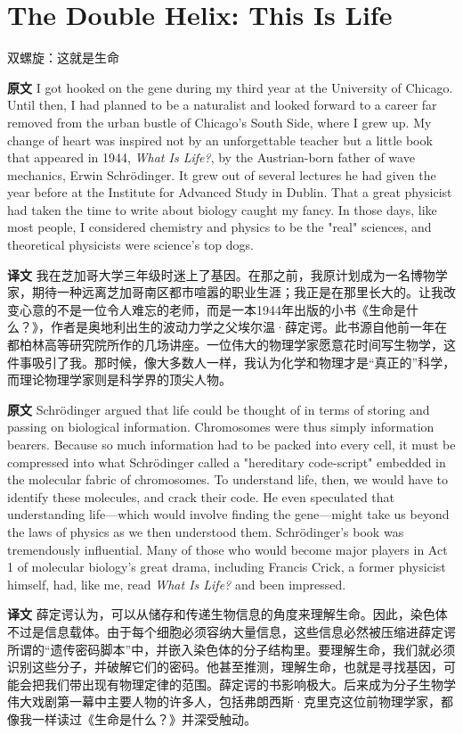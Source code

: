 \documentclass[UTF8,zihao=-4]{ctexart}
\newcommand{\BodyFont}{\fontsize{10.5pt}{15.5pt}\selectfont}
\renewenvironment{quote}{\par\noindent\begingroup\BodyFont}{\par\endgroup}
\begin{document}
\section*{The Double Helix: This Is Life}
\begin{center}
\large 双螺旋：这就是生命
\end{center}

\begin{quote}
\noindent\textbf{原文} I got hooked on the gene during my third year at the University of Chicago. Until then, I had planned to be a naturalist and looked forward to a career far removed from the urban bustle of Chicago's South Side, where I grew up. My change of heart was inspired not by an unforgettable teacher but a little book that appeared in 1944, \emph{What Is Life?}, by the Austrian-born father of wave mechanics, Erwin Schrödinger. It grew out of several lectures he had given the year before at the Institute for Advanced Study in Dublin. That a great physicist had taken the time to write about biology caught my fancy. In those days, like most people, I considered chemistry and physics to be the "real" sciences, and theoretical physicists were science's top dogs.

\smallskip
\noindent\textbf{译文} 我在芝加哥大学三年级时迷上了基因。在那之前，我原计划成为一名博物学家，期待一种远离芝加哥南区都市喧嚣的职业生涯；我正是在那里长大的。让我改变心意的不是一位令人难忘的老师，而是一本1944年出版的小书《生命是什么？》，作者是奥地利出生的波动力学之父埃尔温·薛定谔。此书源自他前一年在都柏林高等研究院所作的几场讲座。一位伟大的物理学家愿意花时间写生物学，这件事吸引了我。那时候，像大多数人一样，我认为化学和物理才是“真正的”科学，而理论物理学家则是科学界的顶尖人物。
\end{quote}

\begin{quote}
\noindent\textbf{原文} Schrödinger argued that life could be thought of in terms of storing and passing on biological information. Chromosomes were thus simply information bearers. Because so much information had to be packed into every cell, it must be compressed into what Schrödinger called a "hereditary code-script" embedded in the molecular fabric of chromosomes. To understand life, then, we would have to identify these molecules, and crack their code. He even speculated that understanding life---which would involve finding the gene---might take us beyond the laws of physics as we then understood them. Schrödinger's book was tremendously influential. Many of those who would become major players in Act 1 of molecular biology's great drama, including Francis Crick, a former physicist himself, had, like me, read \emph{What Is Life?} and been impressed.

\smallskip
\noindent\textbf{译文} 薛定谔认为，可以从储存和传递生物信息的角度来理解生命。因此，染色体不过是信息载体。由于每个细胞必须容纳大量信息，这些信息必然被压缩进薛定谔所谓的“遗传密码脚本”中，并嵌入染色体的分子结构里。要理解生命，我们就必须识别这些分子，并破解它们的密码。他甚至推测，理解生命，也就是寻找基因，可能会把我们带出现有物理定律的范围。薛定谔的书影响极大。后来成为分子生物学伟大戏剧第一幕中主要人物的许多人，包括弗朗西斯·克里克这位前物理学家，都像我一样读过《生命是什么？》并深受触动。
\end{quote}
\end{document}
